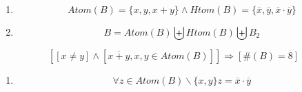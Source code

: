 \begin{enumerate}
\begin{enumerate}
\begin{enumerate}
\begin{enumerate}
\begin{enumerate}
\begin{enumerate}
            \begin{enumerate}
            \def\labelenumvii{\arabic{enumvii}.}
            \tightlist
            \item
              Supongamos \[{z = {\overline{x} \cdot \overline{y}}} = 0\]
            \item
              \[{z = \overline{x+y}} = 0\]
            \item
              \[{\overline{z} = {x + y}} = 1\]
            \item
              \[{x \cdot y} = 0\]
            \item
              \[{x = {\overline{y} \land y}} = \overline{x}\]
            \item
              \[{{\{{x,y}\}} \subseteq \mathit{Atom}}{{(B)} \cap \mathit{Htom}}{(B)}\]
            \item
              \[\mathit{Atom}{{(B)} \cap \mathit{Htom}}{{(B)} \neq \varnothing}\]
            \item
              \[{B \simeq {B_{4} \land \#}}{{(B)} = 8}\mathit{ABSURDO}\]
            \end{enumerate}
          \item
            \[{z \in \mathit{Atom}}{(B)}\]
          \item
            \[{\overline{x+y} \in \mathit{Atom}}{(B)}\]
          \item
            \[{{x + y} \in \mathit{Htom}}{(B)}\]
          \end{enumerate}
        \item
          \[\mathit{Atom}{{(B)} = {{\{{x,y,{x + y}}\}} \land \mathit{Htom}}}{{(B)} = {\{{\overline{x},\overline{y},{\overline{x} \cdot \overline{y}}}\}}}\]
        \item
          \[{B = \mathit{Atom}}{(B)}\biguplus\mathit{Htom}{(B)}\biguplus B_{2}\]
        \end{enumerate}
      \end{enumerate}

      \[\left\lbrack {\left\lbrack {x \neq y} \right\rbrack \land \left\lbrack {\overline{x+y},x,{y \in \mathit{Atom}}{(B)}} \right\rbrack} \right\rbrack\Rightarrow\left\lbrack {\#{{(B)} = 8}} \right\rbrack\]

      \begin{enumerate}
      \def\labelenumiv{\arabic{enumiv}.}
      \setcounter{enumiv}{7}
      \item
        \[\forall{z \in \mathit{Atom}}{{(B)} \smallsetminus {\{{x,y}\}}}{z = {\overline{x} \cdot \overline{y}}}\]


\end{enumerate}
\end{enumerate}
\end{enumerate}
\end{enumerate}
